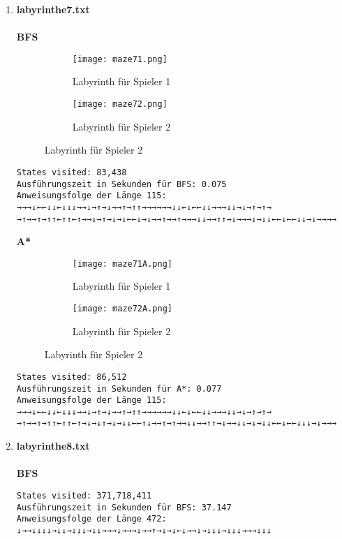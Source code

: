 \documentclass[a4paper,10pt,ngerman]{scrartcl}
\begin{document}
\begin{enumerate}
\begin{verbatim}
Labyrinth zu groß für diese A* Implementierung, verwende BFS! (ist schneller)
\end{verbatim}
  \item \textbf{labyrinthe7.txt}\\
\\\textbf{BFS}
\begin{figure}[H]
    \centering
    \begin{subfigure}{0.45\textwidth}
        \centering
        \texttt{[image: maze71.png]} 
        \caption{Labyrinth für Spieler 1}
    \end{subfigure}
    \hfill
    \begin{subfigure}{0.45\textwidth}
        \centering
        \texttt{[image: maze72.png]}
        \caption{Labyrinth für Spieler 2}
    \end{subfigure}
\end{figure}
\begin{verbatim}
States visited: 83,438
Ausführungszeit in Sekunden für BFS: 0.075
Anweisungsfolge der Länge 115: →→→↓←←↓↓←↓↓↓→→↓→↑→↓→→↑→↑↑→→→→→→↓↓←↓←←↓↓→→→↓↓→↓→↑→↑→
→↑→→↑→↑↑←↑↑←↑→→↓→↑→↓→↓←←↓→↓→→↑→→↑→→→↓↓→→↑↑→↓→→→↓→↓↓←←↓←←↓↓→↓→→→→
\end{verbatim}
\textbf{A*}
\begin{figure}[H]
    \centering
    \begin{subfigure}{0.45\textwidth}
        \centering
        \texttt{[image: maze71A.png]} 
        \caption{Labyrinth für Spieler 1}
    \end{subfigure}
    \hfill
    \begin{subfigure}{0.45\textwidth}
        \centering
        \texttt{[image: maze72A.png]}
        \caption{Labyrinth für Spieler 2}
    \end{subfigure}
\end{figure}
\begin{verbatim}
States visited: 86,512
Ausführungszeit in Sekunden für A*: 0.077
Anweisungsfolge der Länge 115: →→→↓←←↓↓←↓↓↓→→↓→↑→↓→→↑→↑↑→→→→→→↓↓←↓←←↓↓→→→↓↓→↓→↑→↑→
→↑→→↑→↑↑←↑↑←↑→↓→↓↑→↓→↓↓←←↑↓→→↑→↑→→↓↓→→↑↑→↓→→↓↓→↓→↓↓←←↓←←↓↓↓→↓→→→
\end{verbatim}
  \item \textbf{labyrinthe8.txt}\\
\\\textbf{BFS}
\begin{verbatim}
States visited: 371,718,411
Ausführungszeit in Sekunden für BFS: 37.147
Anweisungsfolge der Länge 472: ↓→→↓↓↓↓→↓↓→↓↓↓→↓↓→→→↓→→→↓→→↑→↓→↓←↓→→↓→↓↓↓→↓↓↓→→→↓↓↓

\end{verbatim}
\end{enumerate}
\end{document}
